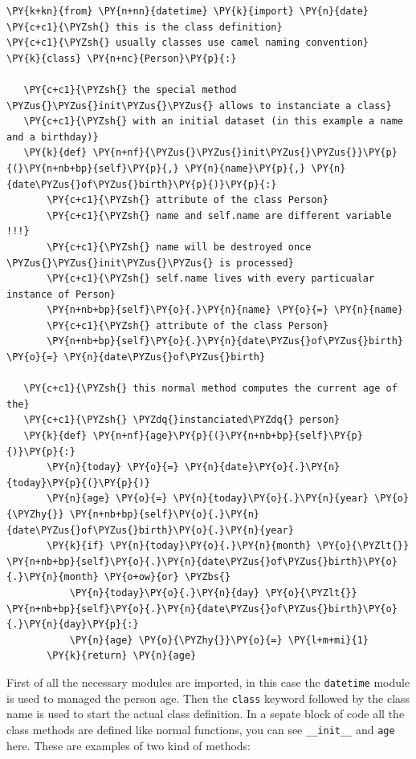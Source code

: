 \begin{Verbatim}[commandchars=\\\{\}]
\PY{k+kn}{from} \PY{n+nn}{datetime} \PY{k}{import} \PY{n}{date}        
\PY{c+c1}{\PYZsh{} this is the class definition}
\PY{c+c1}{\PYZsh{} usually classes use camel naming convention}
\PY{k}{class} \PY{n+nc}{Person}\PY{p}{:}
   
   \PY{c+c1}{\PYZsh{} the special method \PYZus{}\PYZus{}init\PYZus{}\PYZus{} allows to instanciate a class}
   \PY{c+c1}{\PYZsh{} with an initial dataset (in this example a name and a birthday)}
   \PY{k}{def} \PY{n+nf}{\PYZus{}\PYZus{}init\PYZus{}\PYZus{}}\PY{p}{(}\PY{n+nb+bp}{self}\PY{p}{,} \PY{n}{name}\PY{p}{,} \PY{n}{date\PYZus{}of\PYZus{}birth}\PY{p}{)}\PY{p}{:}
       \PY{c+c1}{\PYZsh{} attribute of the class Person}
       \PY{c+c1}{\PYZsh{} name and self.name are different variable !!!}
       \PY{c+c1}{\PYZsh{} name will be destroyed once \PYZus{}\PYZus{}init\PYZus{}\PYZus{} is processed}
       \PY{c+c1}{\PYZsh{} self.name lives with every particualar instance of Person}
       \PY{n+nb+bp}{self}\PY{o}{.}\PY{n}{name} \PY{o}{=} \PY{n}{name} 
       \PY{c+c1}{\PYZsh{} attribute of the class Person}
       \PY{n+nb+bp}{self}\PY{o}{.}\PY{n}{date\PYZus{}of\PYZus{}birth} \PY{o}{=} \PY{n}{date\PYZus{}of\PYZus{}birth} 
       
   \PY{c+c1}{\PYZsh{} this normal method computes the current age of the}
   \PY{c+c1}{\PYZsh{} \PYZdq{}instanciated\PYZdq{} person}
   \PY{k}{def} \PY{n+nf}{age}\PY{p}{(}\PY{n+nb+bp}{self}\PY{p}{)}\PY{p}{:}
       \PY{n}{today} \PY{o}{=} \PY{n}{date}\PY{o}{.}\PY{n}{today}\PY{p}{(}\PY{p}{)}
       \PY{n}{age} \PY{o}{=} \PY{n}{today}\PY{o}{.}\PY{n}{year} \PY{o}{\PYZhy{}} \PY{n+nb+bp}{self}\PY{o}{.}\PY{n}{date\PYZus{}of\PYZus{}birth}\PY{o}{.}\PY{n}{year}
       \PY{k}{if} \PY{n}{today}\PY{o}{.}\PY{n}{month} \PY{o}{\PYZlt{}} \PY{n+nb+bp}{self}\PY{o}{.}\PY{n}{date\PYZus{}of\PYZus{}birth}\PY{o}{.}\PY{n}{month} \PY{o+ow}{or} \PYZbs{}
           \PY{n}{today}\PY{o}{.}\PY{n}{day} \PY{o}{\PYZlt{}} \PY{n+nb+bp}{self}\PY{o}{.}\PY{n}{date\PYZus{}of\PYZus{}birth}\PY{o}{.}\PY{n}{day}\PY{p}{:}
           \PY{n}{age} \PY{o}{\PYZhy{}}\PY{o}{=} \PY{l+m+mi}{1}
       \PY{k}{return} \PY{n}{age}
\end{Verbatim}

First of all the necessary modules are imported, in this case the \texttt{datetime} module is used to managed the person age.
Then the \texttt{class} keyword followed by the class name is used to start the actual class definition. In a sepate block of code all the class methods are defined like normal functions, you can see \texttt{\_\_init\_\_} and \texttt{age} here. These are examples of two kind of methods:

